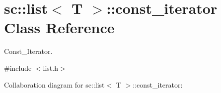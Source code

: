 \hypertarget{classsc_1_1list_1_1const__iterator}{}\section{sc\+:\+:list$<$ T $>$\+:\+:const\+\_\+iterator Class Reference}
\label{classsc_1_1list_1_1const__iterator}


Const\+\_\+\+Iterator.  




{\ttfamily \#include $<$list.\+h$>$}



Collaboration diagram for sc\+:\+:list$<$ T $>$\+:\+:const\+\_\+iterator\+:
